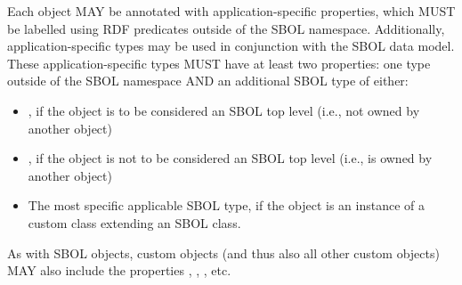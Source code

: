 Each  object MAY be annotated with application-specific properties, which MUST be labelled using RDF predicates outside of the SBOL namespace.  Additionally, application-specific types may be used in conjunction with the SBOL data model. These application-specific types MUST have at least two  properties: one type outside of the SBOL namespace AND an additional SBOL type of either:

\begin{itemize}
  \item {}, if the object is to be considered an SBOL top level (i.e., not owned by another object)
  \item {}, if the object is not to be considered an SBOL top level (i.e., is owned by another object)
  \item The most specific applicable SBOL type, if the object is an instance of a custom class extending an SBOL class.
\end{itemize}

As with SBOL  objects, custom  objects (and thus also all other custom objects) MAY also include the properties , , , etc. 

